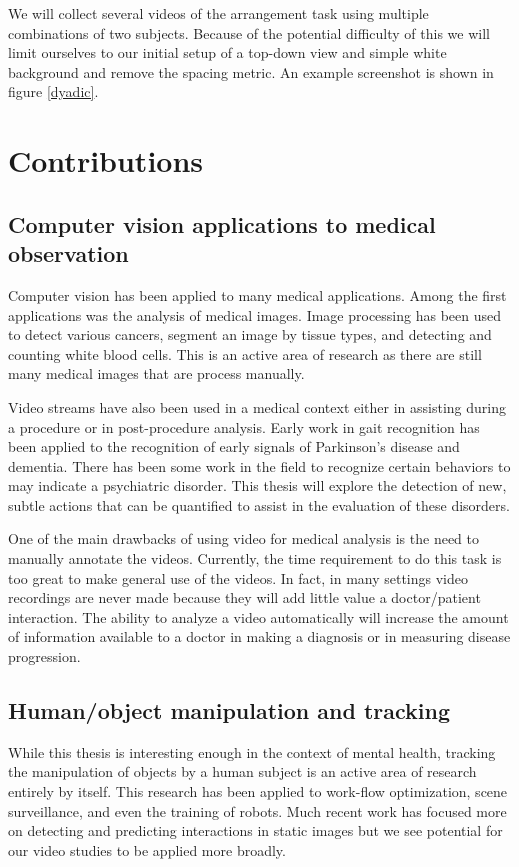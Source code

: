 \documentclass[11pt]{article}
\begin{document}
We will collect several videos of the arrangement task using multiple combinations of two subjects. Because of the potential difficulty of this we will limit ourselves to our initial setup of a top-down view and simple white background and remove the spacing metric. An example screenshot is shown in figure \ref{dyadic}.
\section{Contributions}
\subsection{Computer vision applications to medical observation}
Computer vision has been applied to many medical applications. Among the first applications was the analysis of medical images. Image processing has been used to detect various cancers, segment an image by tissue types, and detecting and counting white blood cells. This is an active area of research as there are still many medical images that are process manually.

Video streams have also been used in a medical context either in assisting during a procedure or in post-procedure analysis. Early work in gait recognition has been applied to the recognition of early signals of Parkinson's disease and dementia. There has been some work in the field to recognize certain behaviors to may indicate a psychiatric disorder. This thesis will explore the detection of new, subtle actions that can be quantified to assist in the evaluation of these disorders.

One of the main drawbacks of using video for medical analysis is the need to manually annotate the videos. Currently, the time requirement to do this task is too great to make general use of the videos. In fact, in many settings video recordings are never made because they will add little value a doctor/patient interaction. The ability to analyze a video automatically will increase the amount of information available to a doctor in making a diagnosis or in measuring disease progression.
\subsection{Human/object manipulation and tracking}
While this thesis is interesting enough in the context of mental health, tracking the manipulation of objects by a human subject is an active area of research entirely by itself. This research has been applied to work-flow optimization, scene surveillance, and even the training of robots. Much recent work has focused more on detecting and predicting interactions in static images but we see potential for our video studies to be applied more broadly.
\end{document}
